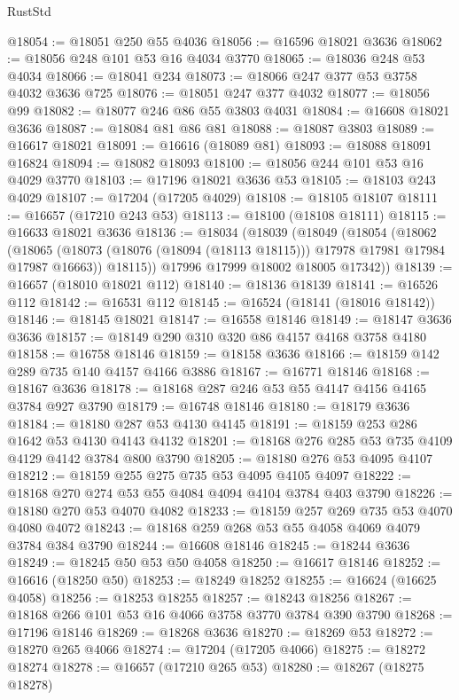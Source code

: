 \begin{lexlean}{RustStd}
\begin{coremodule}
@18054 := @18051 @250 @55 @4036
@18056 := @16596 @18021 @3636
@18062 := @18056 @248 @101 @53 @16 @4034 @3770
@18065 := @18036 @248 @53 @4034
@18066 := @18041 @234
@18073 := @18066 @247 @377 @53 @3758 @4032 @3636 @725
@18076 := @18051 @247 @377 @4032
@18077 := @18056 @99
@18082 := @18077 @246 @86 @55 @3803 @4031
@18084 := @16608 @18021 @3636
@18087 := @18084 @81 @86 @81
@18088 := @18087 @3803
@18089 := @16617 @18021
@18091 := @16616 (@18089 @81)
@18093 := @18088 @18091 @16824
@18094 := @18082 @18093
@18100 := @18056 @244 @101 @53 @16 @4029 @3770
@18103 := @17196 @18021 @3636 @53
@18105 := @18103 @243 @4029
@18107 := @17204 (@17205 @4029)
@18108 := @18105 @18107
@18111 := @16657 (@17210 @243 @53)
@18113 := @18100 (@18108 @18111)
@18115 := @16633 @18021 @3636
@18136 := @18034
    (@18039
      (@18049
        (@18054
          (@18062
            (@18065 (@18073 (@18076 (@18094 (@18113 @18115))) @17978 @17981 @17984 @17987 @16663))
            @18115))
        @17996
        @17999
        @18002
        @18005
        @17342))
@18139 := @16657 (@18010 @18021 @112)
@18140 := @18136 @18139
@18141 := @16526 @112
@18142 := @16531 @112
@18145 := @16524 (@18141 (@18016 @18142))
@18146 := @18145 @18021
@18147 := @16558 @18146
@18149 := @18147 @3636 @3636
@18157 := @18149 @290 @310 @320 @86 @4157 @4168 @3758 @4180
@18158 := @16758 @18146
@18159 := @18158 @3636
@18166 := @18159 @142 @289 @735 @140 @4157 @4166 @3886
@18167 := @16771 @18146
@18168 := @18167 @3636
@18178 := @18168 @287 @246 @53 @55 @4147 @4156 @4165 @3784 @927 @3790
@18179 := @16748 @18146
@18180 := @18179 @3636
@18184 := @18180 @287 @53 @4130 @4145
@18191 := @18159 @253 @286 @1642 @53 @4130 @4143 @4132
@18201 := @18168 @276 @285 @53 @735 @4109 @4129 @4142 @3784 @800 @3790
@18205 := @18180 @276 @53 @4095 @4107
@18212 := @18159 @255 @275 @735 @53 @4095 @4105 @4097
@18222 := @18168 @270 @274 @53 @55 @4084 @4094 @4104 @3784 @403 @3790
@18226 := @18180 @270 @53 @4070 @4082
@18233 := @18159 @257 @269 @735 @53 @4070 @4080 @4072
@18243 := @18168 @259 @268 @53 @55 @4058 @4069 @4079 @3784 @384 @3790
@18244 := @16608 @18146
@18245 := @18244 @3636
@18249 := @18245 @50 @53 @50 @4058
@18250 := @16617 @18146
@18252 := @16616 (@18250 @50)
@18253 := @18249 @18252
@18255 := @16624 (@16625 @4058)
@18256 := @18253 @18255
@18257 := @18243 @18256
@18267 := @18168 @266 @101 @53 @16 @4066 @3758 @3770 @3784 @390 @3790
@18268 := @17196 @18146
@18269 := @18268 @3636
@18270 := @18269 @53
@18272 := @18270 @265 @4066
@18274 := @17204 (@17205 @4066)
@18275 := @18272 @18274
@18278 := @16657 (@17210 @265 @53)
@18280 := @18267 (@18275 @18278)

\end{coremodule}
\end{lexlean}
